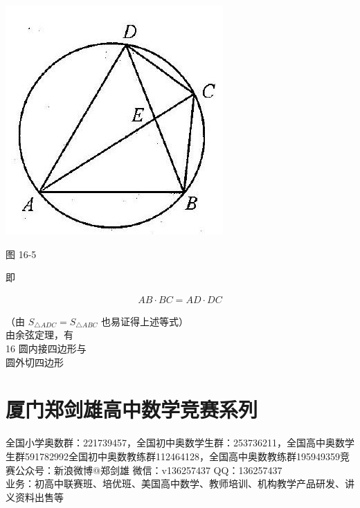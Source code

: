 \documentclass[10pt]{article}
\begin{document}
\begin{center}
\includegraphics[max width=\textwidth]{2024_10_30_2c8f45efd4a519b08e1ag-149(1)}
\end{center}

图 16-5

即

\begin{align*}
A B \cdot B C=A D \cdot D C
\end{align*}

（由 $S_{\triangle A D C}=S_{\triangle A B C}$ 也易证得上述等式）\\
由余弦定理，有\\
16 圆内接四边形与\\
圆外切四边形

\section*{厦门郑剑雄高中数学竞赛系列}
全国小学奥数群：221739457，全国初中奥数学生群：253736211，全国高中奥数学生群591782992全国初中奥数教练群112464128，全国高中奥数教练群195949359竞赛公众号：新浪微博@郑剑雄 微信：v136257437 QQ：136257437\\
业务：初高中联赛班、培优班、美国高中数学、教师培训、机构教学产品研发、讲义资料出售等
\end{document}
